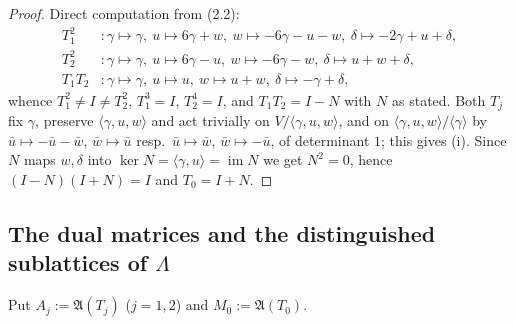 \begin{proof}
Direct computation from (2.2):
\[
\begin{aligned}
T_1^2 &\colon \gamma\mapsto\gamma,\ u\mapsto 6\gamma+w,\ w\mapsto -6\gamma-u-w,\ \delta\mapsto -2\gamma+u+\delta, \\
T_2^2 &\colon \gamma\mapsto\gamma,\ u\mapsto 6\gamma-u,\ w\mapsto -6\gamma-w,\ \delta\mapsto u+w+\delta, \\
T_1T_2 &\colon \gamma\mapsto\gamma,\ u\mapsto u,\ w\mapsto u+w,\ \delta\mapsto -\gamma+\delta,
\end{aligned}
\]
whence $T_1^2 \ne I \ne T_2^2$, $T_1^3 = I$, $T_2^4 = I$, and $T_1T_2 = I-N$ with $N$ as stated. Both $T_j$ fix $\gamma$, preserve $\langle \gamma,u,w\rangle$ and act trivially on $V/\langle\gamma,u,w\rangle$, and on $\langle\gamma,u,w\rangle/\langle\gamma\rangle$ by $\bar u \mapsto -\bar u - \bar w$, $\bar w \mapsto \bar u$ resp.\ $\bar u \mapsto \bar w$, $\bar w \mapsto -\bar u$, of determinant $1$; this gives (i). Since $N$ maps $w,\delta$ into $\ker N = \langle\gamma,u\rangle = \operatorname{im} N$ we get $N^2 = 0$, hence $(I-N)(I+N) = I$ and $T_0 = I+N$.
\end{proof}

\subsection{The dual matrices and the distinguished sublattices of $\Lambda$}

\begin{definition}
Put $A_j := \mathfrak A(T_j)$ ($j=1,2$) and $M_0 := \mathfrak A(T_0)$.
\end{definition}

